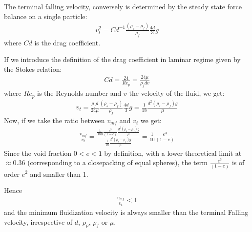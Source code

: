 \documentclass[letterpaper,10pt,english]{jupyterBook}
\begin{document}
\sphinxAtStartPar
The terminal falling velocity, conversely is determined by the steady state force balance on a single particle:
\begin{equation*}
\begin{split}
v_t^2=Cd^{-1}\frac{(\rho_s-\rho_f)}{\rho_f}\frac{4d}{3}g
\end{split}
\end{equation*}
\sphinxAtStartPar
where \(Cd\) is the drag coefficient.

\sphinxAtStartPar
If we introduce the definition of the drag coefficient in laminar regime given by the Stokes relation:
\begin{equation*}
\begin{split}
Cd=\frac{24}{Re_p}=\frac{24\mu}{\rho_fdv}
\end{split}
\end{equation*}
\sphinxAtStartPar
where \(Re_p\) is the Reynolds number and \(v\) the velocity of the fluid, we get:
\begin{equation*}
\begin{split}
v_t=\frac{\rho_fd}{24\mu}\frac{(\rho_s-\rho_f)}{\rho_f}\frac{4d}{3}g=\frac{1}{18}\frac{d^2(\rho_s-\rho_f)g}{\mu}
\end{split}
\end{equation*}
\sphinxAtStartPar
Now, if we take the ratio between \(v_{mf}\) and \(v_t\) we get:
\begin{equation*}
\begin{split}
\frac{v_{mf}}{v_t}=\frac{\frac{1}{180}\frac{e^3}{(1-e)}\frac{d^2(\rho_s-\rho_f)g}{\mu}}{\frac{1}{18}\frac{d^2(\rho_s-\rho_f)g}{\mu}}=\frac{1}{10}\frac{e^3}{(1-e)}
\end{split}
\end{equation*}
\sphinxAtStartPar
Since the void fraction \(0<e<1\) by definition, with a lower theoretical limit at \(\approx{0.36}\) (corresponding to a close\sphinxhyphen{}packing of equal spheres),  the term \(\frac{e^3}{(1-e)}\) is of order \(e^2\) and smaller than 1.

\sphinxAtStartPar
Hence
\begin{equation*}
\begin{split}
\frac{v_{mf}}{v_t}<1
\end{split}
\end{equation*}
\sphinxAtStartPar
and the minimum fluidization velocity is always smaller than the terminal Falling velocity, irrespective of \(d\), \(\rho_p\), \(\rho_f\) or \(\mu\).
\end{document}
